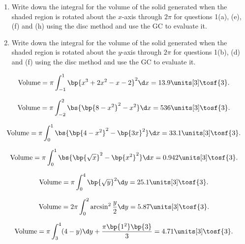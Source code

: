 \begin{problem}
    \begin{enumerate}
        \item Write down the integral for the volume of the solid generated when the shaded region is rotated about the $x$-axis through $2\pi$ for questions 1(a), (e), (f) and (h) using the disc method and use the GC to evaluate it.
        \item Write down the integral for the volume of the solid generated when the shaded region is rotated about the $y$-axis through $2\pi$ for questions 1(b), (d) and (f) using the disc method and use the GC to evaluate it.
    \end{enumerate}
\end{problem}
\begin{solution}
    \begin{ppart}
        \begin{psubpart}
            \[\volume = \pi \int_{-1}^1 \bp{x^3 + 2x^2 - x - 2}^2 \d x = 13.9 \units[3] \tosf{3}.\]
        \end{psubpart}
        \begin{psubpart}
            \[\volume = \pi \int_{-2}^2 \bs{\bp{8-x^2}^2 - x^2} \d x = 536 \units[3] \tosf{3}.\]
        \end{psubpart}
        \begin{psubpart}
            \[\volume = \pi \int_0^1 \bs{\bp{4-x^2}^2 - \bp{3x}^2} \d x = 33.1 \units[3] \tosf{3}.\]
        \end{psubpart}
        \begin{psubpart}
            \[\volume = \pi \int_0^1 \bs{\bp{\sqrt x}^2 - \bp{x^2}^2} \d x = 0.942 \units[3] \tosf{3}.\]
        \end{psubpart}
    \end{ppart}
    \begin{ppart}
        \begin{psubpart}
            \[\volume = \pi \int_0^4 \bp{\sqrt{y}}^2 \d y = 25.1 \units[3] \tosf{3}.\]
        \end{psubpart}
        \begin{psubpart}
            \[\volume = 2\pi \int_0^2 \arcsin^2 \frac{y}2 \d y = 5.87 \units[3] \tosf{3}.\]
        \end{psubpart}
        \begin{psubpart}
            \[\volume = \pi \int_3^4 (4-y) \d y + \frac{\pi\bp{1^2}\bp{3}}3 = 4.71 \units[3] \tosf{3}.\]
        \end{psubpart}
    \end{ppart}
\end{solution}

